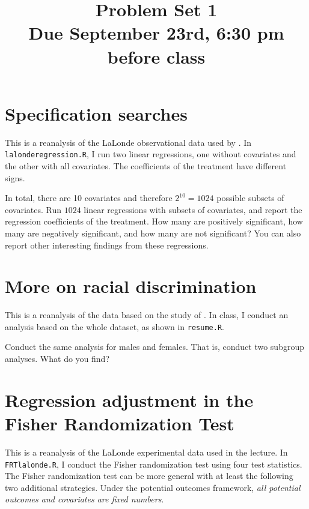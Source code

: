 \documentclass[11pt]{article}
\theoremstyle{definition}
\begin{document}
\doublespacing
\title{\bf  Problem Set 1\\
Due September 23rd, 6:30 pm before class
}
\date{}
\maketitle





\section{Specification searches}

This is a reanalysis of the LaLonde observational data used by \citet{hainmueller2012entropy}. In \texttt{lalonderegression.R}, I run two linear regressions, one without covariates and the other with all covariates. The coefficients of the treatment have different signs.

In total, there are 10 covariates and therefore $2^{10} = 1024$ possible subsets of covariates. Run $1024$ linear regressions with subsets of covariates, and report the regression coefficients of the treatment. How many are positively significant, how many are negatively significant, and how many are not significant? You can also report other interesting findings from these regressions.




\section{More on racial discrimination}

This is a reanalysis of the data based on the study of \citet{bertrand2004emily}. In class, I conduct an analysis based on the whole dataset, as shown in \texttt{resume.R}.

Conduct the same analysis for males and females. That is, conduct two subgroup analyses. What do you find?





\section{Regression adjustment in the Fisher Randomization Test}

This is a reanalysis of the LaLonde experimental data used in the lecture. In \texttt{FRTlalonde.R}, I conduct the Fisher randomization test using four test statistics. The Fisher randomization test can be more general with at least the following two additional strategies. Under the potential outcomes framework, {\it all potential outcomes and covariates are fixed numbers}. 
\end{document}
